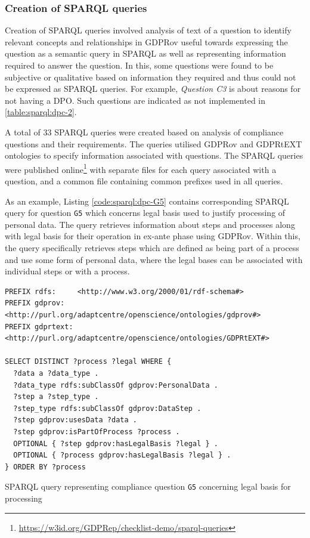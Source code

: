 \subsubsection{Creation of SPARQL queries}
Creation of SPARQL queries involved analysis of text of a question to identify relevant concepts and relationships in GDPRov useful towards expressing the question as a semantic query in SPARQL as well as representing information required to answer the question.
In this, some questions were found to be subjective or qualitative based on information they required and thus could not be expressed as SPARQL queries. For example, \textit{Question C3} is about reasons for not having a DPO. Such questions are indicated as not implemented in \autoref{table:sparql:dpc-2}.

A total of 33 SPARQL queries were created based on analysis of compliance questions and their requirements.
The queries utilised GDPRov and GDPRtEXT ontologies to specify information associated with questions.
The SPARQL queries were published online\footnote{\url{https://w3id.org/GDPRep/checklist-demo/sparql-queries}}
with separate files for each query associated with a question, and a common file containing common prefixes used in all queries.

As an example, Listing \autoref{code:sparql:dpc-G5} contains corresponding SPARQL query for question \texttt{G5} which concerns legal basis used to justify processing of personal data. 
The query retrieves information about steps and processes along with legal basis for their operation in ex-ante phase using GDPRov.
Within this, the query specifically retrieves steps which are defined as being part of a process and use some form of personal data, where the legal bases can be associated with individual steps or with a process.
\begin{listing}[htbp]
\begin{verbatim}
PREFIX rdfs:     <http://www.w3.org/2000/01/rdf-schema#>
PREFIX gdprov:   <http://purl.org/adaptcentre/openscience/ontologies/gdprov#>
PREFIX gdprtext: <http://purl.org/adaptcentre/openscience/ontologies/GDPRtEXT#>

SELECT DISTINCT ?process ?legal WHERE {
  ?data a ?data_type .
  ?data_type rdfs:subClassOf gdprov:PersonalData .
  ?step a ?step_type .
  ?step_type rdfs:subClassOf gdprov:DataStep .
  ?step gdprov:usesData ?data . 
  ?step gdprov:isPartOfProcess ?process .
  OPTIONAL { ?step gdprov:hasLegalBasis ?legal } .
  OPTIONAL { ?process gdprov:hasLegalBasis ?legal } .
} ORDER BY ?process
\end{verbatim}
\caption{SPARQL query representing compliance question \texttt{G5} concerning legal basis for processing}
\label{code:sparql:dpc-G5}
\end{listing}

